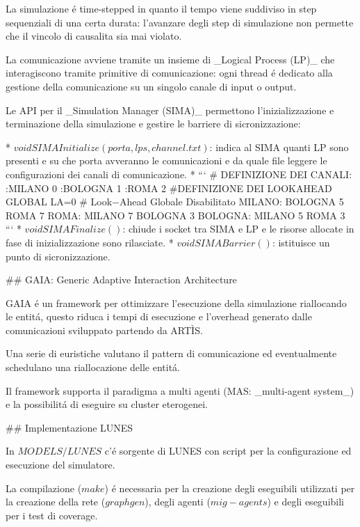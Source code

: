 La simulazione é time-stepped in quanto il tempo viene suddiviso in step sequenziali di una certa durata: l'avanzare degli step di simulazione non permette che il vincolo di causalita sia mai violato.

La comunicazione avviene tramite un insieme di \_Logical Process (LP)\_ che interagiscono tramite primitive di comunicazione: ogni thread é dedicato alla gestione della comunicazione su un singolo canale di input o output.

Le API per il \_Simulation Manager (SIMA)\_ permettono l'inizializzazione e terminazione della simulazione e gestire le barriere di sicronizzazione:

* $void SIMA Initialize(porta, lps, channel.txt)$: indica al SIMA quanti LP sono presenti e su che porta avveranno le comunicazioni e da quale file leggere le configurazioni dei canali di comunicazione.
  * ```
    # DEFINIZIONE DEI CANALI:
    :MILANO 0
    :BOLOGNA 1
    :ROMA 2
    #DEFINIZIONE DEI LOOKAHEAD
    GLOBAL LA=0 # Look−Ahead Globale Disabilitato
    MILANO: BOLOGNA 5 ROMA 7
    ROMA: MILANO 7 BOLOGNA 3
    BOLOGNA: MILANO 5 ROMA 3
    ```
* $void SIMA Finalize()$: chiude i socket tra SIMA e LP e le risorse allocate in fase di inizializzazione sono rilasciate.
* $void SIMA Barrier()$: istituisce un punto di sicronizzazione.

## GAIA: Generic Adaptive Interaction Architecture

GAIA é un framework per ottimizzare l'esecuzione della simulazione riallocando le entitá, questo riduca i tempi di esecuzione e l'overhead generato dalle comunicazioni sviluppato partendo da ARTÌS.

Una serie di euristiche valutano il pattern di comunicazione ed eventualmente schedulano una riallocazione delle entitá.

Il framework supporta il paradigma a multi agenti (MAS: \_multi-agent system\_) e la possibilitá di eseguire su cluster eterogenei.

## Implementazione LUNES

In $MODELS/LUNES$ c'é sorgente di LUNES con script per la configurazione ed esecuzione del simulatore.

La compilazione ($make$) é necessaria per la creazione degli eseguibili utilizzati per la creazione della rete ($graphgen$), degli agenti ($mig-agents$) e degli eseguibili per i test di coverage.

